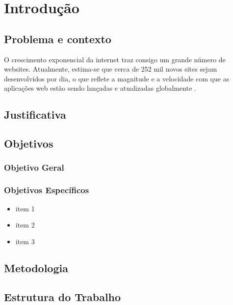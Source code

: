 \chapter{Introdução}
\label{cap:introducao}

\section{Problema e contexto}

O crescimento exponencial da internet traz consigo um grande número de websites. Atualmente, estima-se que cerca de 252 mil novos sites sejam desenvolvidos por dia, o que reflete a magnitude e a velocidade com que as aplicações web estão sendo lançadas e atualizadas globalmente \cite{dataInternetUsage}.

\section{Justificativa}


\section{Objetivos}

\subsection{Objetivo Geral}


\subsection{Objetivos Específicos}
\begin{itemize}
\item item 1
\item item 2
\item item 3
\end{itemize}

\section{Metodologia}


\section{Estrutura do Trabalho}

